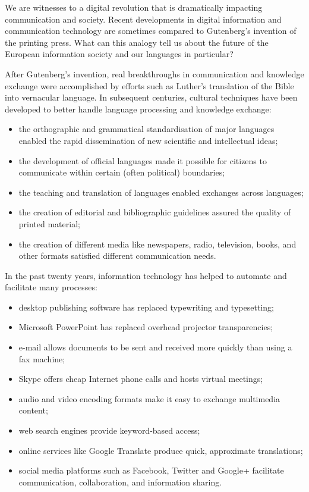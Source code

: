 \documentclass[]{../metanetpaper}
\begin{document}
\begin{multicols}{2}

We are witnesses to a digital revolution that is dramatically impacting communication and society. Recent developments in digital information and communication technology are sometimes compared to Gutenberg’s invention of the printing press. What can this analogy tell us about the future of the European information society and our languages in particular?


 After Gutenberg’s invention, real breakthroughs in communication and knowledge exchange were accomplished by efforts such as Luther’s translation of the Bible into vernacular language. In subsequent centuries, cultural techniques have been developed to better handle language processing and knowledge exchange:

\begin{itemize}
\item the orthographic and grammatical standardisation of major languages enabled the rapid dissemination of new scientific and intellectual ideas;
\item the development of official languages made it possible for citizens to communicate within certain (often political) boundaries;
\item the teaching and translation of languages enabled exchanges across languages;
\item the creation of editorial and bibliographic guidelines assured the quality of printed material;
\item the creation of different media like newspapers, radio, television, books, and other formats satisfied different communication needs. 
\end{itemize}

In the past twenty years, information technology has helped to automate and facilitate many processes:

\begin{itemize}
\item desktop publishing software has replaced typewriting and typesetting;
\item Microsoft PowerPoint has replaced overhead projector transparencies;
\item e-mail allows documents to be sent and received more quickly than using a fax machine;
\item Skype offers cheap Internet phone calls and hosts virtual meetings;
\item audio and video encoding formats make it easy to exchange multimedia content;
\item web search engines provide keyword-based access;
\item online services like Google Translate produce quick, approximate translations;
\item social media platforms such as Facebook, Twitter and Google+ facilitate communication, collaboration, and information sharing.
\end{itemize}


\end{multicols}
\end{document}
